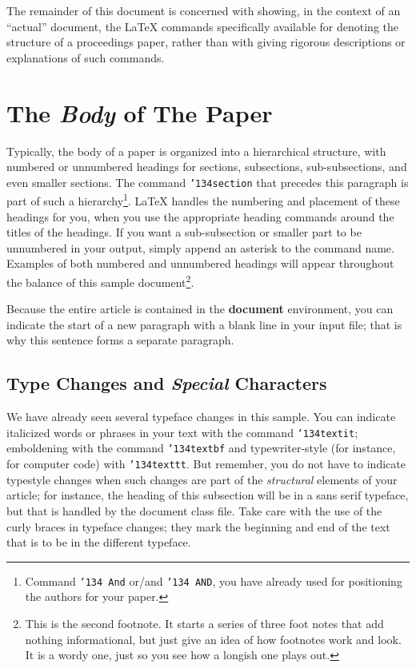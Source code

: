\documentclass[article,english]{stucosrec}
\newcommand{\latex}{\LaTeX\xspace}
\begin{document}
	The remainder of this document is concerned with showing, in the context of an ``actual'' document, the \latex commands specifically available for denoting the structure of a proceedings paper, rather than with giving rigorous descriptions or explanations of such commands.
	
	\section{The \textit{Body} of The Paper}
	
	Typically, the body of a paper is organized into a hierarchical structure, with numbered or unnumbered headings for sections, subsections, sub-subsections, and even smaller sections.
	The command \texttt{{\char'134}section} that precedes this paragraph is part of such a hierarchy\footnote{Command {\texttt{\char'134 And}} or/and {\texttt{\char'134 AND}}, you have already used for positioning the authors for your paper.}. \latex handles the numbering and placement of these headings for you, when you use the appropriate heading commands around the titles of the headings.
	If you want a sub-subsection or smaller part to be unnumbered in your output, simply append an asterisk to the command name.
	Examples of both numbered and unnumbered headings will appear throughout the balance of this sample document\footnote{This is the second footnote. It starts a series of three foot notes that add nothing informational, but just give an idea
of how footnotes work and look. It is a wordy one, just so
you see how a longish one plays out.}.
	
	Because the entire article is contained in the \textbf{document} environment, you can indicate the start of a new paragraph with a blank line in your input file; that is why this sentence forms a separate paragraph.
	
	\subsection{Type Changes and \textit{Special} Characters}
	
	We have already seen several typeface changes in this sample.
	You can indicate italicized words or phrases in your text with the command \texttt{{\char'134}textit}; emboldening with the command \texttt{{\char'134}textbf} and typewriter-style (for instance, for computer code) with \texttt{{\char'134}texttt}.
	But remember, you do not have to indicate typestyle changes when such changes are part of the \textit{structural} elements of your 	article; for instance, the heading of this subsection will be in a sans serif typeface, but that is handled by the document class file. Take care with the use of the curly braces in typeface changes; they mark the beginning and end of the text that is to be in the different typeface.
	
\end{document}
